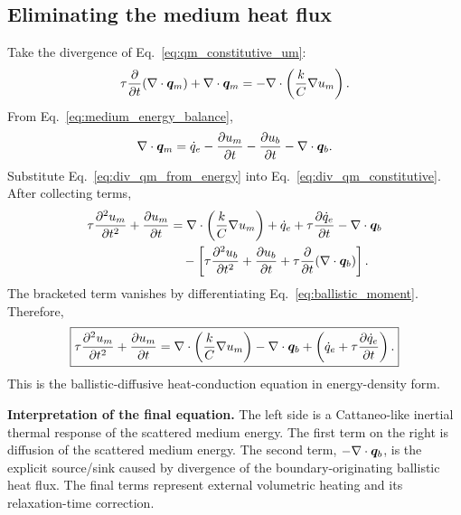 \documentclass[11pt]{article}
\begin{document}
\subsection{Eliminating the medium heat flux}
Take the divergence of Eq.~\eqref{eq:qm_constitutive_um}:
\begin{equation}
    \tau\frac{\partial}{\partial t}(\nabla\cdot\bm{q}_m)+\nabla\cdot\bm{q}_m
    =-\nabla\cdot\left(\frac{k}{C}\nabla u_m\right).
    \label{eq:div_qm_constitutive}
\end{equation}
From Eq.~\eqref{eq:medium_energy_balance},
\begin{equation}
    \nabla\cdot\bm{q}_m=\dot{q}_e-\frac{\partial u_m}{\partial t}-\frac{\partial u_b}{\partial t}-\nabla\cdot\bm{q}_b.
    \label{eq:div_qm_from_energy}
\end{equation}
Substitute Eq.~\eqref{eq:div_qm_from_energy} into Eq.~\eqref{eq:div_qm_constitutive}. After collecting terms,
\begin{align}
    \tau\frac{\partial^2u_m}{\partial t^2}+\frac{\partial u_m}{\partial t}
    &=\nabla\cdot\left(\frac{k}{C}\nabla u_m\right)
    +\dot{q}_e+\tau\frac{\partial\dot{q}_e}{\partial t}
    -\nabla\cdot\bm{q}_b \\
    &\quad -\left[\tau\frac{\partial^2u_b}{\partial t^2}+\frac{\partial u_b}{\partial t}
    +\tau\frac{\partial}{\partial t}(\nabla\cdot\bm{q}_b)\right].
\end{align}
The bracketed term vanishes by differentiating Eq.~\eqref{eq:ballistic_moment}. Therefore,
\begin{equation}
    \boxed{\tau\frac{\partial^2u_m}{\partial t^2}+\frac{\partial u_m}{\partial t}
    =\nabla\cdot\left(\frac{k}{C}\nabla u_m\right)
    -\nabla\cdot\bm{q}_b
    +\left(\dot{q}_e+\tau\frac{\partial\dot{q}_e}{\partial t}\right).}
    \label{eq:bd_energy_final}
\end{equation}
This is the ballistic-diffusive heat-conduction equation in energy-density form.

\begin{physicsbox}
\textbf{Interpretation of the final equation.} The left side is a Cattaneo-like inertial thermal response of the scattered medium energy. The first term on the right is diffusion of the scattered medium energy. The second term, \(-\nabla\cdot\bm{q}_b\), is the explicit source/sink caused by divergence of the boundary-originating ballistic heat flux. The final terms represent external volumetric heating and its relaxation-time correction.
\end{physicsbox}
\end{document}
